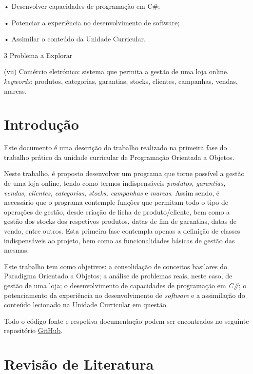 \documentclass[
]{article}
\begin{document}
• Desenvolver capacidades de programação em C\#;

• Potenciar a experiência no desenvolvimento de software;

• Assimilar o conteúdo da Unidade Curricular.

\protect\hypertarget{_Toc182595577}{}{}3 Problema a Explorar

(vii) Comércio eletrónico: sistema que permita a gestão de uma loja
online. \emph{keywords}: produtos, categorias, garantias, stocks,
clientes, campanhas, vendas, marcas.

\hypertarget{introduuxe7uxe3o}{%
\section{\texorpdfstring{Introdução
}{Introdução }}\label{introduuxe7uxe3o}}

Este documento é uma descrição do trabalho realizado na primeira fase do
trabalho prático da unidade curricular de Programação Orientada a
Objetos.

Neste trabalho, é proposto desenvolver um programa que torne possível a
gestão de uma loja online, tendo como termos indispensáveis
\emph{produtos, garantias, vendas, clientes, categorias, stocks,
campanhas} e \emph{marcas}. Assim sendo, é necessário que o programa
contemple funções que permitam todo o tipo de operações de gestão, desde
criação de ficha de produto/cliente, bem como a gestão dos stocks dos
respetivos produtos, datas de fim de garantias, datas de venda, entre
outros. Esta primeira fase contempla apenas a definição de classes
indispensáveis ao projeto, bem como as funcionalidades básicas de gestão
das mesmas.

Este trabalho tem como objetivos: a consolidação de conceitos basilares
do Paradigma Orientado a Objetos; a análise de problemas reais, neste
caso, de gestão de uma loja; o desenvolvimento de capacidades de
programação em \emph{C\#}; o potenciamento da experiência no
desenvolvimento de \emph{software} e a assimilação do conteúdo lecionado
na Unidade Curricular em questão.

Todo o código fonte e respetiva documentação podem ser encontrados no
seguinte repositório
\href{https://github.com/zealves99/TP_POO_27967}{\uline{GitHub}}.

\hypertarget{revisuxe3o-de-literatura}{%
\section{\texorpdfstring{Revisão de Literatura
}{Revisão de Literatura }}\label{revisuxe3o-de-literatura}}
\end{document}
